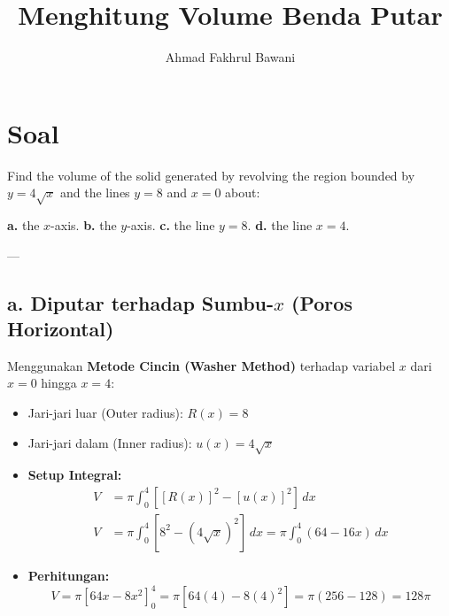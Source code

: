 \documentclass[12pt,a4paper]{article}
\title{Menghitung Volume Benda Putar}
\author{Ahmad Fakhrul Bawani}
\date{}
\begin{document}
\maketitle

\section*{Soal}

Find the volume of the solid generated by revolving the region bounded by $y = 4\sqrt{x}$ and the lines $y = 8$ and $x = 0$ about:
\begin{center}
  \textbf{a.} the $x$-axis. \qquad \textbf{b.} the $y$-axis. \qquad \textbf{c.} the line $y = 8$. \qquad \textbf{d.} the line $x = 4$.
\end{center}

---

\subsection*{a. Diputar terhadap Sumbu-$x$ (Poros Horizontal)}
Menggunakan \textbf{Metode Cincin (Washer Method)} terhadap variabel $x$ dari $x = 0$ hingga $x = 4$:
\begin{itemize}
  \item Jari-jari luar (Outer radius): $R(x) = 8$
  \item Jari-jari dalam (Inner radius): $u(x) = 4\sqrt{x}$
  \item \textbf{Setup Integral:}
    \begin{align*}
      V &= \pi \int_{0}^{4} \left[ [R(x)]^2 - [u(x)]^2 \right] \, dx \\
      V &= \pi \int_{0}^{4} \left[ 8^2 - (4\sqrt{x})^2 \right] \, dx = \pi \int_{0}^{4} (64 - 16x) \, dx
    \end{align*}
  \item \textbf{Perhitungan:}
    \begin{equation*}
      V = \pi \left[ 64x - 8x^2 \right]_{0}^{4} = \pi \left[ 64(4) - 8(4)^2 \right] = \pi (256 - 128) = 128\pi
    \end{equation*}
\end{itemize}
\end{document}
